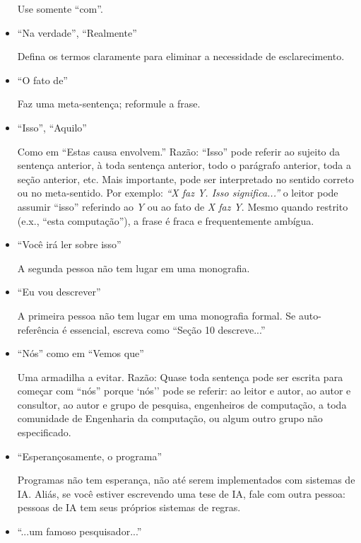 \begin{itemize}
		\indent Use somente ``com''.
		
	\item ``Na verdade'', ``Realmente''

		\indent Defina os termos claramente para eliminar a necessidade de esclarecimento.
		
	\item ``O fato de''

		\indent Faz uma meta-sentença; reformule a frase.
		
	\item ``Isso'', ``Aquilo''

		\indent Como em ``Estas causa envolvem.'' Razão: ``Isso'' pode referir ao sujeito da sentença anterior, à toda sentença anterior, todo o parágrafo anterior, toda a seção anterior, etc. 
		Mais importante, pode ser interpretado no sentido correto ou no meta-sentido. Por exemplo: \textit{``X faz Y. Isso significa...''} o leitor pode assumir ``isso'' referindo ao 			
		\textit	{Y} ou ao fato de \textit{X faz Y}. Mesmo quando restrito (e.x., ``esta computação''), a frase é fraca e frequentemente ambígua.
		
	\item ``Você irá ler sobre isso''

		\indent A segunda pessoa não tem lugar em uma monografia.
		
	\item ``Eu vou descrever''

		\indent A primeira pessoa não tem lugar em uma monografia formal. Se auto-referência é essencial, escreva como ``Seção 10 descreve...''
		
	\item ``Nós'' como em ``Vemos que''

		\indent Uma armadilha a evitar. Razão: Quase toda sentença pode ser escrita para começar com ``nós'' porque `nós'' pode se referir: ao leitor e autor, ao autor e consultor, ao autor e grupo de pesquisa, engenheiros de computação, a toda comunidade de Engenharia da computação, ou algum outro grupo não especificado. 

	\item ``Esperançosamente, o programa''

		\indent Programas não tem esperança, não até serem implementados com sistemas de IA. Aliás, se você estiver escrevendo uma tese de IA, fale com outra pessoa: pessoas de IA tem seus próprios sistemas de regras.
		
	\item ``...um famoso pesquisador...''


\end{itemize}

